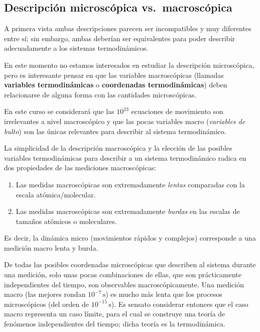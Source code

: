 \subsection*{Descripción microscópica vs.\ macroscópica}

A primera vista ambas descripciones parecen ser incompatibles y muy diferentes entre sí; sin
embargo, ambas deberían ser equivalentes para poder describir adecuadamente a los sistemas
termodinámicos.

En este momento no estamos interesados en estudiar la descripción microscópica, pero es
interesante pensar en que las variables macroscópicas (llamadas \textbf{variables termodinámicas}
o \textbf{coordenadas termodinámicas}) deben relacionarse de alguna forma con las cantidades
microscópicas.

\begin{modelo}
  En este curso se considerará que las $10^{23}$ ecuaciones de movimiento son irrelevantes a nivel
  macroscópico y que las pocas variables macro (\emph{variables de bulto}) son las únicas
  relevantes para describir al sistema termodinámico.
\end{modelo}

La simplicidad de la descripción macroscópica y la elección de las posibles variables
termodinámicas para describir a un sistema termodinámico radica en dos propiedades de las
mediciones macroscópicas:
\begin{enumerate}[label=\arabic*.,itemsep=0pt]
  \item Las medidas macroscópicas son extremadamente \emph{lentas} comparadas con la escala
    atómica/molecular.
  \item Las medidas macroscópicas son extremadamente \emph{burdas} en las escalas de tamaños
    atómicos o moleculares.
\end{enumerate}
Es decir, la dinámica micro (movimientos rápidos y complejos) corresponde a una medición macro
lenta y burda.

De todas las posibles coordenadas microscópicas que describen al sistema durante una medición,
solo unas pocas combinaciones de ellas, que son prácticamente independientes del tiempo, son
observables macroscópicamente. Una medición macro (las mejores rondan $10^{-7}\,\mathrm{s}$) es
mucho más lenta que los procesos microscópicos (del orden de $10^{-15}\,\mathrm{s}$).
Es sensato considerar entonces que el caso macro representa un caso límite, para el cual se
construye una teoría de fenómenos independientes del tiempo; dicha teoría es la termodinámica.

